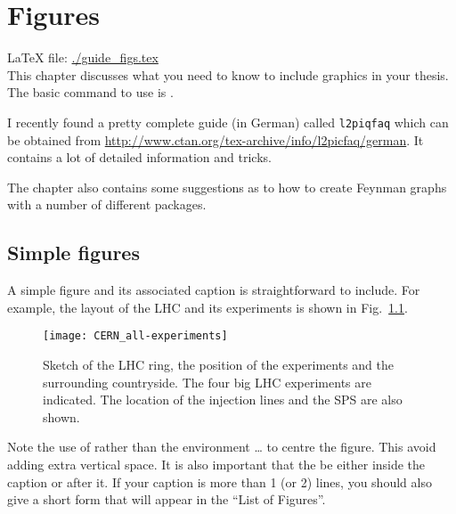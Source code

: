 \chapter{Figures}
\label{sec:fig}

\LaTeX{} file: \url{./guide_figs.tex}\\[1ex]
\noindent
This chapter discusses what you need to know to include graphics in
your thesis. The basic command to use is .

I recently found a pretty complete guide (in German) called \texttt{l2piqfaq}
which can be obtained from
\url{http://www.ctan.org/tex-archive/info/l2picfaq/german}. It contains
a lot of detailed information and tricks.

The chapter also contains some suggestions as to how to create Feynman
graphs with a number of different packages.

\section{Simple figures}
\label{sec:fig:simple}

A simple figure and its associated caption is straightforward to
include. For example, the layout of the LHC and its experiments is
shown in Fig.~\ref{fig:LHC}.

\begin{figure}[htbp]
  \centering
  \texttt{[image: CERN\_all-experiments]}
  \caption[Sketch of the LHC ring, the position of the experiments and
  the surrounding countryside.]{Sketch of the LHC ring, the position
    of the experiments and the surrounding countryside. The four big
    LHC experiments are indicated. The location of the injection lines
    and the SPS are also shown.}
  \label{fig:LHC}
\end{figure}

Note the use of  rather than the environment
 \ldots {} to centre the figure. This
avoid adding extra vertical space. It is also important that the
 be either inside the caption or after it. If your
caption is more than 1 (or 2) lines, you should also give a short form
that will appear in the ``List of Figures''.

